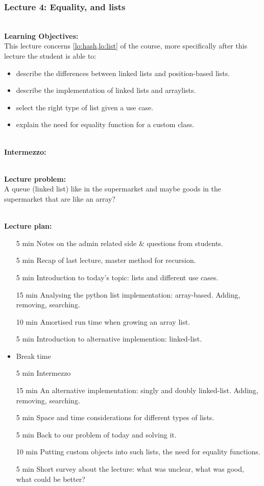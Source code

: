 \newpage
\subsubsection{Lecture 4: Equality, and lists}
\label{sub:lecture_4}

\hfill\\
\textbf{Learning Objectives:}\\

This lecture concerns \cref{lo:hash,lo:list} of the course, more specifically after this lecture the student is able
to:
\begin{itemize}
	\item describe the differences between linked lists and position-based lists.
	\item describe the implementation of linked lists and arraylists.
	\item select the right type of list given a use case.
	\item explain the need for equality function for a custom class.
\end{itemize}

\hfill\\
\textbf{Intermezzo:}\\

\hfill\\
\textbf{Lecture problem:}\\
A queue (linked list) like in the supermarket and maybe goods in the supermarket that are like an array? 

\hfill\\
\textbf{Lecture plan:}\\
\begin{itemize}
	\item[5 min] Notes on the admin related side \& questions from students.
	\item[5 min] Recap of last lecture, master method for recursion.
	\item[5 min] Introduction to today's topic: lists and different use cases.
	\item[15 min] Analysing the python list implementation: array-based. Adding, removing, searching.
	\item[10 min] Amortised run time when growing an array list.
	\item[5 min] Introduction to alternative implemention: linked-list.
	\item Break time
	\item[5 min] Intermezzo
	\item[15 min] An alternative implementation: singly and doubly linked-list. Adding, removing, searching.
	\item[5 min] Space and time considerations for different types of lists.
	\item[5 min] Back to our problem of today and solving it.
	\item[10 min] Putting custom objects into such lists, the need for equality functions.
	\item[5 min] Short survey about the lecture: what was unclear, what was good, what could be better?
\end{itemize}

